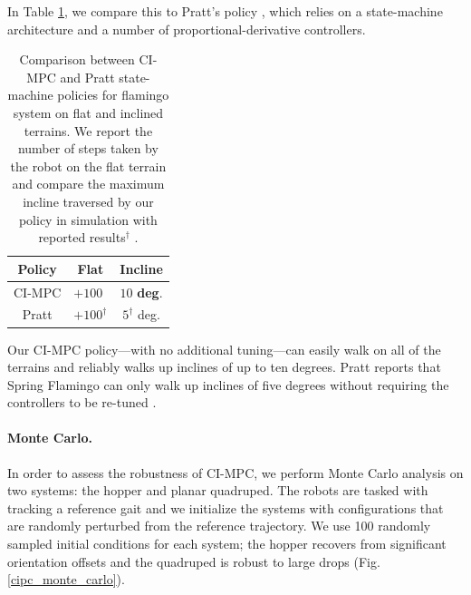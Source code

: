 In Table \ref{cipc_biped_results}, we compare this to Pratt's policy \cite{pratt2000thesis}, which relies on a state-machine architecture and a number of proportional-derivative controllers. 

\begin{table}[H]
	\centering
	\caption[Comparison between CI-MPC and Pratt-heuristic policies for biped locomotion]{Comparison between CI-MPC and Pratt state-machine \cite{pratt2000thesis} policies for flamingo system on flat and inclined terrains. We report the number of steps taken by the robot on the flat terrain and compare the maximum incline traversed by our policy in simulation with reported results$^{\dagger}$ \cite{pratt1998intuitive}.}
	
	\begin{tabular}{c c c}
		\toprule
		\textbf{Policy} &
		\textbf{Flat} &
		\textbf{Incline}\\
		\toprule
		CI-MPC & $+100\phantom{^{\dagger}}$ & \boldmath $10$ \unboldmath \textbf{deg}. \\ 
		Pratt & $+100^{\dagger}$ &  $ 5^{\dagger}$  deg. \\ 
		\toprule
	\end{tabular}
	\label{cipc_biped_results}
\end{table}

Our CI-MPC policy---with no additional tuning---can easily walk on all of the terrains and reliably walks up inclines of up to ten degrees. Pratt reports that Spring Flamingo can only walk up inclines of five degrees without requiring the controllers to be re-tuned \cite{pratt1998intuitive}.

\paragraph{Monte Carlo.}
In order to assess the robustness of CI-MPC, we perform Monte Carlo analysis on two systems: the hopper and planar quadruped. The robots are tasked with tracking a reference gait and we initialize the systems with configurations that are randomly perturbed from the reference trajectory. We use 100 randomly sampled initial conditions for each system; the hopper recovers from significant orientation offsets and the quadruped is robust to large drops (Fig. \ref{cipc_monte_carlo}).

